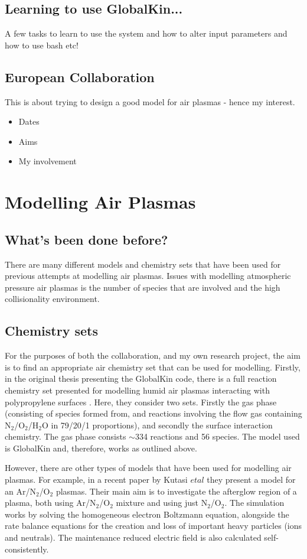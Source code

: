 \documentclass[11pt, oneside]{article}   	%
\begin{document}
\subsection{Learning to use GlobalKin...}
A few tasks to learn to use the system and how to alter input parameters and how to use bash etc! 

\subsection{European Collaboration}
This is about trying to design a good model for air plasmas - hence my interest.
\begin{itemize}
\item Dates
\item Aims
\item My involvement
\end{itemize}


\section{Modelling Air Plasmas}
\subsection{What's been done before?} 
There are many different models and chemistry sets that have been used for previous attempts at modelling air plasmas. 
Issues with modelling atmospheric pressure air plasmas is the number of species that are involved and the high collisionality environment.
\subsection{Chemistry sets}
For the purposes of both the collaboration, and my own research project, the aim is to find an appropriate air chemistry set that can be used for modelling.
Firstly, in the original thesis presenting the GlobalKin code, there is a full reaction chemistry set presented for modelling humid air plasmas interacting with polypropylene surfaces \cite{Dorai2002modeling}.
Here, they consider two sets.
Firstly the gas phase (consisting of species formed from, and reactions involving the flow gas containing N$_2$/O$_2$/H$_2$O in 79/20/1 proportions), and secondly the surface interaction chemistry. 
The gas phase consists $\sim$334 reactions and 56 species. 
The model used is GlobalKin and, therefore, works as outlined above.

However, there are other types of models that have been used for modelling air plasmas.
For example, in a recent paper by Kutasi $et al$ \cite{Kutasi2016tuning} they present a model for an Ar/N$_2$/O$_2$ plasmas.
Their main aim is to investigate the afterglow region of a plasma, both using Ar/N$_2$/O$_2$ mixture and using just N$_2$/O$_2$.
The simulation works by solving the homogeneous electron Boltzmann equation, alongside the rate balance equations for the creation and loss of important heavy particles (ions and neutrals). 
The maintenance reduced electric field is also calculated self-consistently.
\end{document}

